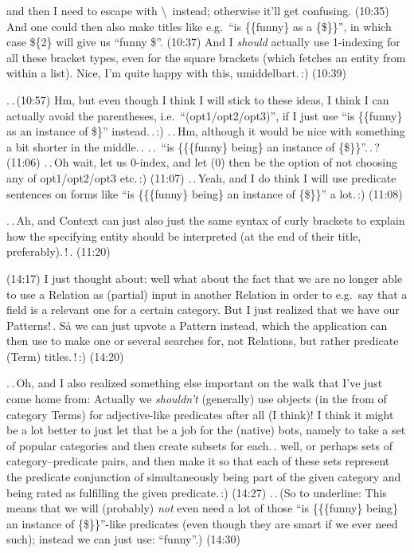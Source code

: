 \documentclass{report}
\begin{document}
and then I need to escape with \textbackslash\ instead; otherwise it'll get confusing. (10:35) And one could then also make titles like e.g.\ ``is \{\{funny\} as a \{\$\}\}'', in which case \$\{2\} will give us ``funny \$''. (10:37) And I \emph{should} actually use 1-indexing for all these bracket types, even for the square brackets (which fetches an entity from within a list). Nice, I'm quite happy with this, umiddelbart.\,:) (10:39)

.\,.\,(10:57) Hm, but even though I think I will stick to these ideas, I think I can actually avoid the parentheses, i.e.\ ``(opt1/opt2/opt3)'', if I just use ``is \{\{funny\} as an instance of \$\}'' instead.\,.\,:) .\,.\,Hm, although it would be nice with something a bit shorter in the middle.\,. .\,.\, ``is \{\{\{funny\} being\} an instance of \{\$\}\}''.\,.\,? (11:06) .\,.\,Oh wait, let us 0-index, and let (0) then be the option of not choosing any of opt1/opt2/opt3 etc.\,:) (11:07) .\,.\,Yeah, and I do think I will use predicate sentences on forms like ``is \{\{\{funny\} being\} an instance of \{\$\}\}'' a lot.\,:) (11:08)

.\,.\,Ah, and Context can just also just the same syntax of curly brackets to explain how the specifying entity should be interpreted (at the end of their title, preferably).\,!\,. (11:20)

(14:17) I just thought about: well what about the fact that we are no longer able to use a Relation as (partial) input in another Relation in order to e.g.\ say that a field is a relevant one for a certain category. But I just realized that we have our Patterns!\,. Så we can just upvote a Pattern instead, which the application can then use to make one or several searches for, not Relations, but rather predicate (Term) titles.\,!\,:) (14:20)

.\,.\,Oh, and I also realized something else important on the walk that I've just come home from: Actually we \emph{shouldn't} (generally) use objects (in the from of category Terms) for adjective-like predicates after all (I think)! I think it might be a lot better to just let that be a job for the (native) bots, namely to take a set of popular categories and then create subsets for each.\,. well, or perhaps sets of category--predicate pairs, and then make it so that each of these sets represent the predicate conjunction of simultaneously being part of the given category and being rated as fulfilling the given predicate.\,:) (14:27) .\,.\,(So to underline: This means that we will (probably) \emph{not} even need a lot of those ``is \{\{\{funny\} being\} an instance of \{\$\}\}''-like predicates (even though they are smart if we ever need such); instead we can just use: ``funny''.) (14:30)
\end{document}
